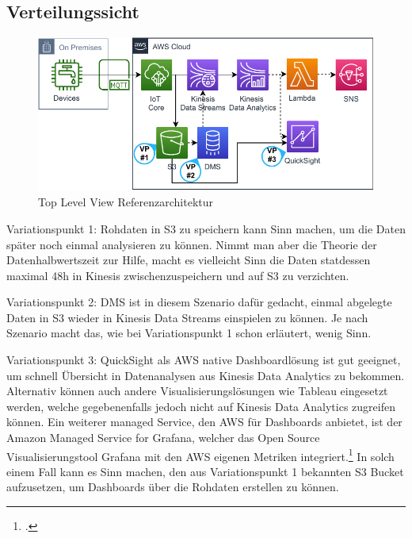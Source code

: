 \subsection{Verteilungssicht}
\begin{figure}[H]
\centering
\includegraphics[width=\textwidth]{graphics/Echtzeit-RA-Overview.pdf}
\caption{Top Level View Referenzarchitektur}
\label{abb:TopLevelEchtzeitRA}
\end{figure}
Variationspunkt 1: Rohdaten in \ac{S3} zu speichern kann Sinn machen, um die Daten später noch einmal analysieren zu können. Nimmt man aber die Theorie der Datenhalbwertszeit zur Hilfe, macht es vielleicht Sinn die Daten statdessen maximal 48h in Kinesis zwischenzuspeichern und auf \ac{S3} zu verzichten.

Variationspunkt 2: \ac{DMS} ist in diesem Szenario dafür gedacht, einmal abgelegte Daten in S3 wieder in Kinesis Data Streams einspielen zu können. Je nach Szenario macht das, wie bei Variationspunkt 1 schon erläutert, wenig Sinn.

Variationspunkt 3: QuickSight als \ac{AWS} native Dashboardlösung ist gut geeignet, um schnell Übersicht in Datenanalysen aus Kinesis Data Analytics zu bekommen. Alternativ können auch andere Visualisierungslösungen wie Tableau eingesetzt werden, welche gegebenenfalls jedoch nicht auf Kinesis Data Analytics zugreifen können. Ein weiterer managed Service, den \ac{AWS} für Dashboards anbietet, ist der Amazon Managed Service for Grafana, welcher das Open Source Visualisierungstool Grafana mit den \ac{AWS} eigenen Metriken integriert.\footcite[Vgl.][]{Dutt.2020} In solch einem Fall kann es Sinn machen, den aus Variationspunkt 1 bekannten \ac{S3} Bucket aufzusetzen, um Dashboards über die Rohdaten erstellen zu können. 

